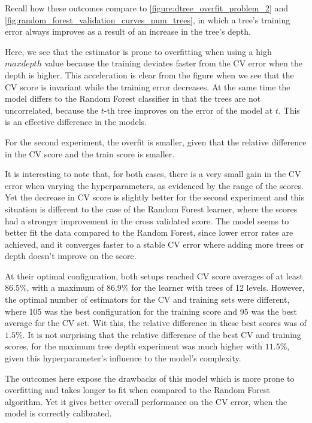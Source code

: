 Recall how these outcomes compare to \cref{figure:dtree_overfit_problem_2} and \cref{fig:random_forest_validation_curves_num_trees},
in which a tree's training error always improves as a result of an increase in the tree's depth.

Here, we see that the estimator is prone to overfitting when using a high $max depth$ value because the training deviates faster from the CV error when the depth is higher.
This acceleration is clear from the figure when we see that the CV score is invariant while the training error decreases.
At the same time the model differs to the Random Forest classifier in that the trees are not uncorrelated, because the $t$-th tree improves on the error of the model at $t$.
This is an effective difference in the models.

For the second experiment, the overfit is smaller, given that the relative difference in the CV score and the train score is smaller.

It is interesting to note that, for both cases, there is a very small gain in the CV error when varying the hyperparameters, as evidenced by the range of the scores.
Yet the decrease in CV score is slightly better for the second experiment and this situation is different to the case of the Random Forest learner, where the scores had a stronger improvement in the cross validated score.
The model seems to better fit the data compared to the Random Forest, since lower error rates are achieved, and it converges faster to a stable CV error where adding more trees or depth doesn't improve on the score.

At their optimal configuration, both setups reached CV score averages of at least $86.5\%$, with a maximum of $86.9\%$ for the learner with trees of 12 levels.
However, the optimal number of estimators for the CV and training sets were different, where 105 was the best configuration for the training score and 95 was the best average for the CV set.
Wit this, the relative difference in these best scores was of $1.5\%$.
It is not surprising that the relative difference of the best CV and training scores, for the maximum tree depth experiment was much higher with $11.5\%$, given this hyperparameter's influence to the model's complexity.

The outcomes here expose the drawbacks of this model which is more prone to overfitting and takes longer to fit when compared to the Random Forest algorithm.
Yet it gives better overall performance on the CV error, when the model is correctly calibrated.



